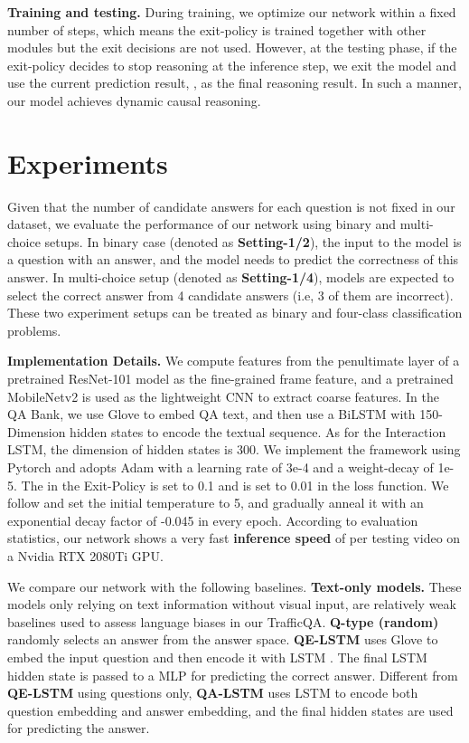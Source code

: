 \documentclass[final]{cvpr}
\begin{document}
{\bf Training and testing.} During training, we optimize our network within a fixed number of steps, which means the exit-policy is trained together with other modules but the exit decisions 
are not used. However, at the testing phase, if the exit-policy decides to stop reasoning at the  inference step, we exit the model and use the current prediction result, , as the final reasoning result. In such a manner, our model achieves dynamic causal reasoning.

\section{Experiments} \label{sec:exp}
Given that the number of candidate answers for each question is not fixed in our dataset, we evaluate the performance of our network using binary and multi-choice setups. In binary case (denoted as \textbf{Setting-1/2}), the input to the model is a question with an answer, and the model needs to predict the correctness of this answer. In multi-choice setup (denoted as \textbf{Setting-1/4}), models are expected to select the correct answer from 4 candidate answers (i.e, 3 of them are incorrect). These two experiment setups can be treated as binary and four-class classification problems.

{\bf Implementation Details.} 
We compute features from the penultimate layer of a pretrained ResNet-101 model \cite{he2016deep} as the fine-grained frame feature,
and a pretrained MobileNetv2 \cite{sandler2018mobilenetv2} is used as the lightweight CNN to extract coarse features. In the QA Bank, we use Glove \cite{Pennington14glove:global} to embed QA text, and then use a BiLSTM with 150-Dimension hidden states to encode the textual sequence.  As for the Interaction LSTM, the dimension of hidden states is 300.
We implement the framework using Pytorch and adopts Adam \cite{kingma2014adam} with a learning rate of 3e-4 and a weight-decay of 1e-5. The  in the Exit-Policy is set to 0.1 and  is set to 0.01 in the loss function. We follow \cite{jang2016categorical} and set the initial temperature  to 5, and gradually anneal it with an exponential decay factor of -0.045 in every epoch. According to evaluation statistics, our network shows a very fast \textbf{inference speed} of  per testing video on a Nvidia RTX 2080Ti GPU.

We compare our network with the following baselines.
{\bf Text-only models.} These models only relying on text information without visual input, are relatively weak baselines used to assess language biases in our TrafficQA. {\bf Q-type (random)} randomly selects an answer from the answer space. {\bf QE-LSTM} uses Glove \cite{Pennington14glove:global} to embed the input question and then encode it with LSTM \cite{hochreiter1997long}. The final LSTM hidden state is passed to a MLP for predicting the correct answer. Different from {\bf QE-LSTM} using questions only, {\bf QA-LSTM} uses LSTM to encode both question embedding and answer embedding, and the final hidden states are used for predicting the answer.
\end{document}
